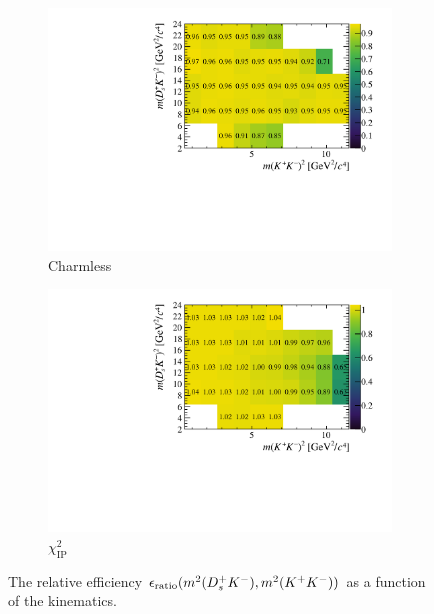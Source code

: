 \begin{figure}[!h]
   \centering
   \begin{subfigure}[t]{0.45\textwidth}
      \includegraphics[width=1.0\textwidth]{figs/B2DsKK/Relative_Eff_FDCHI2_All.pdf}
      \caption{Charmless}
      \label{fig:B2DsKK_releff_charmless}
   \end{subfigure}
   \begin{subfigure}[t]{0.45\textwidth}
      \includegraphics[width=1.0\textwidth]{figs/B2DsKK/Relative_Eff_Bcut_All.pdf}
      \caption{$\chi^{2}_{\text{IP}}$}
      \label{fig:B2DsKK_releff_ipchi2}
   \end{subfigure}
   \caption{The relative efficiency $\epsilon_{\text{ratio}}(m^{2}({{D}^+_{s}}{{K}^-}),m^{2}({{K}^+}{{K}^-}))$ as a function of the \decay{\Bp}{\Dsp\Kp\Km} kinematics.}
   \label{fig:B2DsKK_dalitz_eff_two}
\end{figure}

